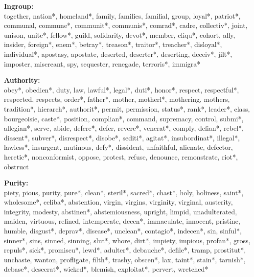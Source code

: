 \documentclass[12pt]{article}
\begin{document}
\begin{flushleft}
\textbf{Ingroup:}\\
together, nation*, homeland*, family, families, familial, group, loyal*, patriot*, communal, commune*, communit*, communis*, comrad*, cadre, collectiv*, joint, unison, unite*, fellow*, guild, solidarity, devot*, member, cliqu*, cohort, ally, insider, foreign*, enem*, betray*, treason*, traitor*, treacher*, disloyal*, individual*, apostasy, apostate, deserted, deserter*, deserting, deceiv*, jilt*, imposter, miscreant, spy, sequester, renegade, terroris*, immigra*
\vspace{.5cm}

\textbf{Authority:}\\
obey*, obedien*, duty, law, lawful*, legal*, duti*, honor*, respect, respectful*, respected, respects, order*, father*, mother, motherl*, mothering, mothers, tradition*, hierarch*, authorit*, permit, permission, status*, rank*, leader*, class, bourgeoisie, caste*, position, complian*, command, supremacy, control, submi*, allegian*, serve, abide, defere*, defer, revere*, venerat*, comply, defian*, rebel*, dissent*, subver*, disrespect*, disobe*, sediti*, agitat*, insubordinat*, illegal*, lawless*, insurgent, mutinous, defy*, dissident, unfaithful, alienate, defector, heretic*, nonconformist, oppose, protest, refuse, denounce, remonstrate, riot*, obstruct
\vspace{.5cm}

\textbf{Purity:}\\
piety, pious, purity, pure*, clean*, steril*, sacred*, chast*, holy, holiness, saint*, wholesome*, celiba*, abstention, virgin, virgins, virginity, virginal, austerity, integrity, modesty, abstinen*, abstemiousness, upright, limpid, unadulterated, maiden, virtuous, refined, intemperate, decen*, immaculate, innocent, pristine, humble, disgust*, deprav*, disease*, unclean*, contagio*, indecen*, sin, sinful*, sinner*, sins, sinned, sinning, slut*, whore, dirt*, impiety, impious, profan*, gross, repuls*, sick*, promiscu*, lewd*, adulter*, debauche*, defile*, tramp, prostitut*, unchaste, wanton, profligate, filth*, trashy, obscen*, lax, taint*, stain*, tarnish*, debase*, desecrat*, wicked*, blemish, exploitat*, pervert, wretched*
\vspace{.5cm}


\end{flushleft}
\end{document}
